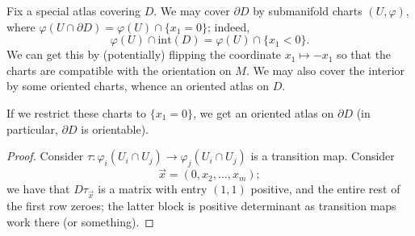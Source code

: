 Fix a special atlas covering $D$. We may cover $\partial D$ by submanifold charts $(U, \varphi)$,  where $\varphi(U \cap \partial D) = \varphi(U) \cap \{x_1 = 0\}$; indeed,
\[ \varphi(U) \cap \mathrm{int}(D) = \varphi(U) \cap \{x_1 < 0\}. \]
We can get this by (potentially) flipping the coordinate $x_1 \mapsto -x_1$ so that the charts are compatible with the orientation on $M$. We may also cover the interior by some oriented charts, whence an oriented atlas on $D$.
\begin{proposition}[\S8.6]
    If we restrict these charts to $\{x_1 = 0\}$, we get an oriented atlas on $\partial D$ (in particular, $\partial D$ is orientable).
\end{proposition}
\begin{proof}
    Consider $\tau \colon \varphi_i(U_i \cap U_j) \to \varphi_j(U_i \cap U_j)$ is a transition map. Consider
    \[ \vec x = (0, x_2, \dots, x_m); \]
    we have that $D \tau_{\vec x}$ is a matrix with entry $(1,1)$ positive, and the entire rest of the first row zeroes; the latter block is positive determinant as transition maps work there (or something).
\end{proof}